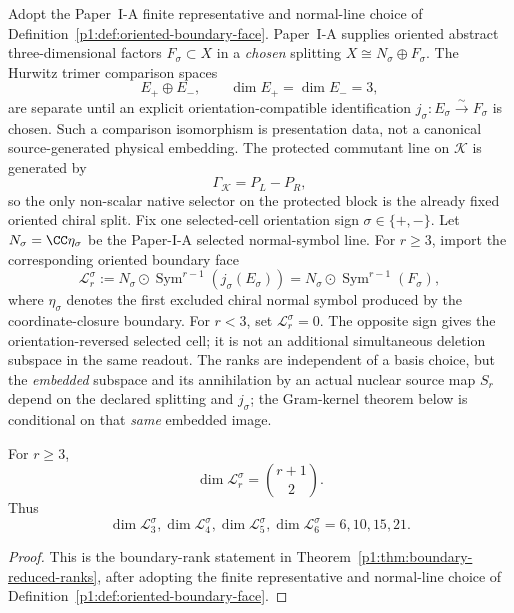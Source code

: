 \documentclass[12pt,a4paper]{article}
\begin{document}
\begin{definition}
\label{p11:def:oriented-coordinate-boundary-face}
Adopt the Paper~I-A finite representative and normal-line choice of Definition~\ref{p1:def:oriented-boundary-face}. Paper~I-A supplies oriented abstract three-dimensional factors \(F_\sigma\subset X\) in a \emph{chosen} splitting \(X\cong N_\sigma\oplus F_\sigma\). The Hurwitz trimer comparison spaces
\[
        E_+\oplus E_- ,\qquad\dim E_+=\dim E_-=3,
\]
are separate until an explicit orientation-compatible identification \(j_\sigma:E_\sigma\xrightarrow{\sim}F_\sigma\) is chosen. Such a comparison isomorphism is presentation data, not a canonical source-generated physical embedding.  The protected commutant line on \(\mathcal K\) is generated by
\[
        \Gamma_{\mathcal K}=P_L-P_R,
\]
so the only non-scalar native selector on the protected block is the already fixed oriented chiral split.
Fix one selected-cell orientation sign \(\sigma\in\{+,-\}\).  Let \(N_\sigma=\CC\eta_\sigma\) be the Paper-I-A selected normal-symbol line.  For \(r\geq3\), import the corresponding oriented boundary face
\[
        \mathcal L_r^\sigma
        :=
        N_\sigma\odot\operatorname{Sym}^{r-1}(j_\sigma(E_\sigma))
        =N_\sigma\odot\operatorname{Sym}^{r-1}(F_\sigma),
\]
where \(\eta_\sigma\) denotes the first excluded chiral normal symbol produced by the coordinate-closure boundary.  For \(r<3\), set \(\mathcal L_r^\sigma=0\).
The opposite sign gives the orientation-reversed selected cell; it is not an additional simultaneous deletion subspace in the same readout. The ranks are independent of a basis choice, but the \emph{embedded} subspace and its annihilation by an actual nuclear source map \(S_r\) depend on the declared splitting and \(j_\sigma\); the Gram-kernel theorem below is conditional on that \emph{same} embedded image.
\end{definition}

\begin{lemma}
\label{p11:lem:triangular-rank-coordinate-boundary}
For \(r\geq3\),
\[
        \dim \mathcal L_r^\sigma
        =
        \binom{r+1}{2}.
\]
Thus
\[
        \dim \mathcal L_3^\sigma,
        \dim \mathcal L_4^\sigma,
        \dim \mathcal L_5^\sigma,
        \dim \mathcal L_6^\sigma
        =
        6,10,15,21.
\]
\end{lemma}

\begin{proof}
This is the boundary-rank statement in
Theorem~\ref{p1:thm:boundary-reduced-ranks}, after adopting the finite
representative and normal-line choice of
Definition~\ref{p1:def:oriented-boundary-face}.
\end{proof}
\end{document}
